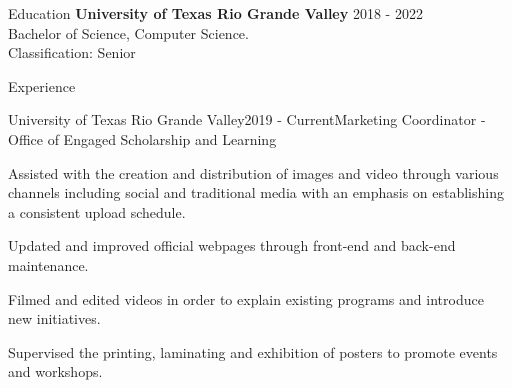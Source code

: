 \documentclass{resume}
\begin{document}
\begin{rSection}{Education}
    {\bf University of Texas Rio Grande Valley} \hfill {2018 - 2022} 
    \\ Bachelor of Science, Computer Science.
    \\ Classification: Senior  
\end{rSection}

\begin{rSection}{Experience}
    \begin{rSubsection}{University of Texas Rio Grande Valley}{2019 - Current}{Marketing Coordinator - Office of Engaged Scholarship and Learning}{}
        \item Assisted with the creation and distribution of images and video through various channels including social and traditional media with an emphasis on establishing a consistent upload schedule.
        \item Updated and improved official webpages through front-end and back-end maintenance.
        \item Filmed and edited videos in order to explain existing programs and introduce new initiatives.
        \item Supervised the printing, laminating and exhibition of posters to promote events and workshops.
    \end{rSubsection}
\end{rSection}
\end{document}
